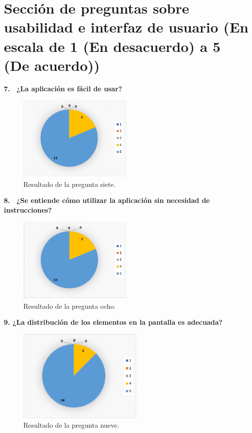 \section{Sección de preguntas sobre usabilidad e interfaz de usuario (En escala de 1 (En desacuerdo) a 5 (De acuerdo))}

\textbf{7.  ¿La aplicación es fácil de usar?}

\begin{figure}[h]
    \centering
    \includegraphics[width=0.5\textwidth]{Imagenes/Pregunta7.1.png}
    \caption{\label{fig: Pregunta7}Resultado de la pregunta siete.}
\end{figure}

\textbf{8.  ¿Se entiende cómo utilizar la aplicación sin necesidad de instrucciones?}

\begin{figure}[h]
    \centering
    \includegraphics[width=0.5\textwidth]{Imagenes/Pregunta8.1.png}
    \caption{\label{fig: Pregunta8}Resultado de la pregunta ocho.}
\end{figure}

\newpage
\textbf{9. ¿La distribución de los elementos en la pantalla es adecuada?}

\begin{figure}[h]
    \centering
    \includegraphics[width=0.55\textwidth]{Imagenes/Pregunta9.1.png}
    \caption{\label{fig: Pregunta9}Resultado de la pregunta nueve.}
\end{figure}

